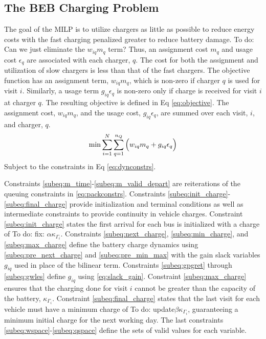 \documentclass[letterpaper, 10pt, conference]{IEEEtran}
\newcommand{\TODO}[1]{{\color{green} To do: #1}}                                %
\begin{document}
\subsection{The BEB Charging Problem} \label{sec:BEB_MILP}
The goal of the MILP is to utilize chargers as little as possible to reduce energy costs with the fast charging penalized greater to reduce battery damage. \TODO{Can we just eliminate the $w_{iq} m_q$ term? }
Thus, an assignment cost $m_q$ and usage cost $\epsilon_q$ are associated with each charger, $q$. The cost for both the
assignment and utilization of slow chargers is less than that of the fast chargers. The objective function has an
assignment term, $w_{iq}m_q$, which is non-zero if charger $q$ is used for visit $i$. Similarly, a usage term $g_{iq}
\epsilon_q$ is non-zero only if charge is received for visit $i$ at charger $q$. The resulting objective is defined in Eq
\ref{eq:objective}. The assignment cost, $w_{iq}m_q$, and the usage cost, $g_{iq}\epsilon_q$, are summed over each visit, $i$,
and charger, $q$.
\begin{equation}
\label{eq:objective}
	\min \sum_{i=1}^N \sum_{q=1}^{n_Q} \Big( w_{iq} m_q + g_{iq} \epsilon_q \Big) \\
\end{equation}
Subject to the constraints in Eq \ref{eq:dynconstrs}.

Constraints \eqref{subeq:m_time}-\eqref{subeq:m_valid_depart} are reiterations of the queuing constraints in \eqref{eq:packconstrs}.
Constraints \eqref{subeq:init_charge}-\eqref{subeq:final_charge} provide initialization and terminal conditions as well
as intermediate constraints to provide continuity in vehicle charges. Constraint \eqref{subeq:init_charge} states the
first arrival for each bus is initialized with a charge of \TODO{fix:} $\alpha \kappa_{\Gamma_i}$.
Constraints \eqref{subeq:next_charge}, \eqref{subeq:min_charge}, and \eqref{subeq:max_charge} define the battery charge dynamics using \eqref{subeq:pre_next_charge} and \eqref{subeq:pre_min_max} with the gain slack variables $g_{iq}$ used in place of the bilinear term.
Constraints \eqref{subeq:gpgret} through \eqref{subeq:gwles} define $g_{iq}$ using \eqref{eq:slack_gain}.
Constraint \eqref{subeq:max_charge} ensures that the charging done for visit $i$ cannot be greater than the capacity of the battery, $\kappa_{\Gamma_i}$. Constraint
\eqref{subeq:final_charge} states that the last visit for each vehicle must have a minimum charge of \TODO{update}$\beta \kappa_{\Gamma_i}$, guaranteeing a minimum initial charge for the next working day.
The last constraints \eqref{subeq:wspace}-\eqref{subeq:qspace} define the sets of valid values for each variable.
\end{document}
